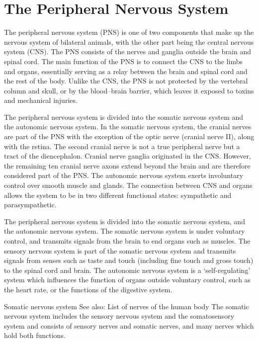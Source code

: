 \hypertarget{the-peripheral-nervous-system}{%
\chapter{The Peripheral Nervous System}\label{the-peripheral-nervous-system}}

The peripheral nervous system (PNS) is one of two components that make up the nervous system of bilateral animals, with the other part being the central nervous system (CNS). The PNS consists of the nerves and ganglia outside the brain and spinal cord. The main function of the PNS is to connect the CNS to the limbs and organs, essentially serving as a relay between the brain and spinal cord and the rest of the body. Unlike the CNS, the PNS is not protected by the vertebral column and skull, or by the blood--brain barrier, which leaves it exposed to toxins and mechanical injuries.

The peripheral nervous system is divided into the somatic nervous system and the autonomic nervous system. In the somatic nervous system, the cranial nerves are part of the PNS with the exception of the optic nerve (cranial nerve II), along with the retina. The second cranial nerve is not a true peripheral nerve but a tract of the diencephalon. Cranial nerve ganglia originated in the CNS. However, the remaining ten cranial nerve axons extend beyond the brain and are therefore considered part of the PNS. The autonomic nervous system exerts involuntary control over smooth muscle and glands. The connection between CNS and organs allows the system to be in two different functional states: sympathetic and parasympathetic.

The peripheral nervous system is divided into the somatic nervous system, and the autonomic nervous system. The somatic nervous system is under voluntary control, and transmits signals from the brain to end organs such as muscles. The sensory nervous system is part of the somatic nervous system and transmits signals from senses such as taste and touch (including fine touch and gross touch) to the spinal cord and brain. The autonomic nervous system is a `self-regulating' system which influences the function of organs outside voluntary control, such as the heart rate, or the functions of the digestive system.

Somatic nervous system
See also: List of nerves of the human body
The somatic nervous system includes the sensory nervous system and the somatosensory system and consists of sensory nerves and somatic nerves, and many nerves which hold both functions.

